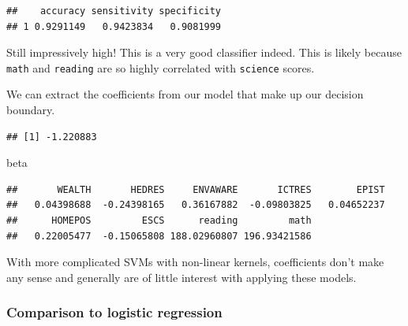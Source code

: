\documentclass[]{book}
\newenvironment{Shaded}{\begin{snugshade}}{\end{snugshade}}
\newcommand{\DecValTok}[1]{\textcolor[rgb]{0.00,0.00,0.81}{#1}}
\newcommand{\KeywordTok}[1]{\textcolor[rgb]{0.13,0.29,0.53}{\textbf{#1}}}
\newcommand{\NormalTok}[1]{#1}
\newcommand{\OperatorTok}[1]{\textcolor[rgb]{0.81,0.36,0.00}{\textbf{#1}}}
\newcommand{\StringTok}[1]{\textcolor[rgb]{0.31,0.60,0.02}{#1}}
\begin{document}
\begin{verbatim}
##    accuracy sensitivity specificity
## 1 0.9291149   0.9423834   0.9081999
\end{verbatim}

Still impressively high! This is a very good classifier indeed. This is likely because \texttt{math} and \texttt{reading} are so highly correlated with \texttt{science} scores.

We can extract the coefficients from our model that make up our decision boundary.

\begin{Shaded}
\end{Shaded}

\begin{verbatim}
## [1] -1.220883
\end{verbatim}

\begin{Shaded}
\begin{Highlighting}[]
\NormalTok{beta}
\end{Highlighting}
\end{Shaded}

\begin{verbatim}
##       WEALTH       HEDRES     ENVAWARE       ICTRES        EPIST 
##   0.04398688  -0.24398165   0.36167882  -0.09803825   0.04652237 
##      HOMEPOS         ESCS      reading         math 
##   0.22005477  -0.15065808 188.02960807 196.93421586
\end{verbatim}

With more complicated SVMs with non-linear kernels, coefficients don't make any sense and generally are of little interest with applying these models.

\hypertarget{comparison-to-logistic-regression}{%
\subsubsection{Comparison to logistic regression}\label{comparison-to-logistic-regression}}
\end{document}

